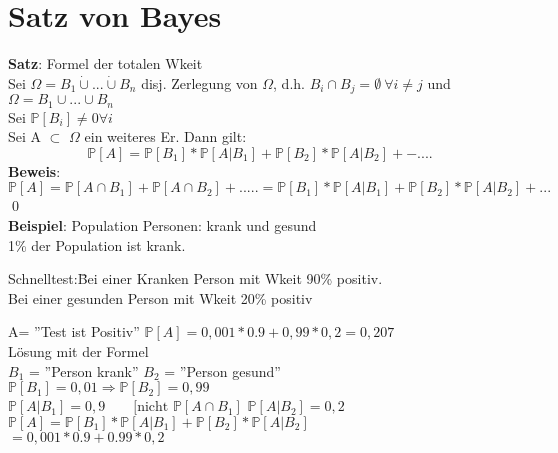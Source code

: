 \chapter{Satz von Bayes}
\textbf{Satz}: Formel der totalen Wkeit\\
Sei $\Omega = B_1  \dot{\cup} ... \dot{\cup} B_n $ disj. Zerlegung von $\Omega$, d.h. $B_i \cap B_j = \emptyset \: \forall i \neq j$ und $\Omega = B_1 \cup ...\cup B_n$\\
Sei $\mathds{P}[B_i] \neq 0 \forall i$\medskip\\
Sei A $\subset$ $\Omega$ ein weiteres Er. Dann gilt: 
$$\mathds{P}[A] = \mathds{P}[B_1]*\mathds{P}[A \vert B_1] + \mathds{P}[B_2]*\mathds{P}[A\vert B_2]+-....$$
\textbf{Beweis}: $\mathds{P}[A] = \mathds{P}[A\cap B_1]+\mathds{P}[A \cap B_2] +.....= \mathds{P}[B_1]*\mathds{P}[A \vert B_1] + \mathds{P}[B_2]*\mathds{P}[A\vert B_2]+... $\qed\medskip\\
\textbf{Beispiel}: Population Personen: krank und gesund\\
1\% der Population ist krank.\medskip\\
\begin{tabbing}
	Schnelltest:\= Bei einer Kranken Person mit Wkeit 90\% positiv.\\
	\> Bei einer gesunden Person mit Wkeit 20\% positiv
\end{tabbing}
A= ''Test ist Positiv''\hspace{1cm} $\mathds{P}[A]= 0,001*0.9+0,99*0,2 = 0,207$\smallskip\\
Lösung mit der Formel\\
$B_1 $ = ''Person krank'' \hspace{1cm} $B_2$ = ''Person gesund''\\
$ \mathds{P}[B_1]=0,01 \Rightarrow  \mathds{P}[B_2] =0,99$\smallskip\\
$\mathds{P}[A \vert B_1] = 0,9 \qquad [\text{nicht } \mathds{P}[A\cap B_1]$\smallskip
$\mathds{P}[A\vert B_2] = 0,2$\smallskip\\
$\mathds{P}[A] = \mathds{P}[B_1]*\mathds{P}[A\vert B_1] + \mathds{P}[B_2]*\mathds{P}[A\vert B_2]$\smallskip\\
$=0,001*0.9+0.99*0,2$